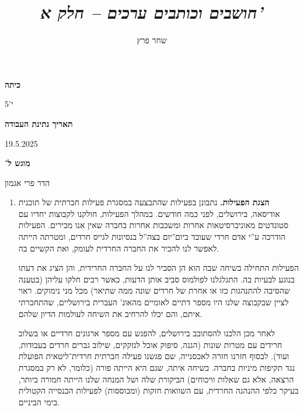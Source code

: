 \documentclass[]{article}
\author{שחר פרץ}
\title{\textit{חושבים וכותבים ערכים – חלק א'}}
\begin{document}
    \maketitle
    \begin{multicols}{3}
        \centering
        \textbf{כיתה} 
        
        י'5
        
        \textbf{תאריך נתינת העבודה}
        
        19.5.2025
        
        \textbf{מוגש ל־}
        
        הדר פרי אגמון
    \end{multicols}
    \large
    \begin{enumerate}
        \item \textbf{הצגת הפעילות. }נתבונן בפעילות שהתבצעה במסגרת פעילות חברתית של תוכנית אודיסאה, בירושלים, לפני כמה חודשים. במהלך הפעילות, חולקנו לקבוצות יחדיו עם סטונדטים מאוניברסיטאות אחרות ומשכבות אחרות בחברה שאין אנו מכירים. הפעילות הודרכה ע''י אדם חרדי שעובד ביום־יום בצה''ל בנסיונות לגייס חרדים, ומטרתה הייתה לאפשר לנו להכיר את החברה החרדית לעומק, ואת הקשיים בה. 
        
        הפעילות התחילה בשיחה שבה הוא הן הסביר לנו על החברה החרידית, והן הציג את דעתו בנוגע לבעיות בה. התגלגלנו לפולמוס סביב אותן הדעות, כאשר רבים חלקו עליהן (בטענה שהסיבה להתנהגות כזו או אחרת של חרדים שונה ממה שתיאר) מכל מני נימוקים. ראוי לציין שבקבוצה שלנו היו מספר דתיים לאומיים מהאונ' העברית בירושליים, שהתחברתי איתם, והם יכלו להרחיב את השיחה לעולמות הדיון שלהם. 
        
        לאחר מכן הלכנו להסתובב בירושלים, להפגש עם מספר ארגונים חרדיים או בשלוב חרידים עם מטרות שונות (הגנה, סיפוק אוכל לנזקקים, שילוב גברים חרדים בעבודות, ועוד). לבסוף חזרנו חזרה לאכסנייה, שם פגשנו פעילה חברתית חרדית־ליטאית הפועלת נגד תקיפות מיניות בחברה. בשיחה איתה, שגם היא הייתה פורה (כלומר, לא רק במסגרת הרצאה, אלא גם שאלות וויכוחים) הביקורת שלה ושל המנחה שלנו הייתה חמורה ביותר, בעיקר כלפי ההנהגה החרדית, עם השוואות חזקות (ומבוססות) לפעילות הכנסייה הקטולית בימי הביניים. 
        

\end{enumerate}
\end{document}
